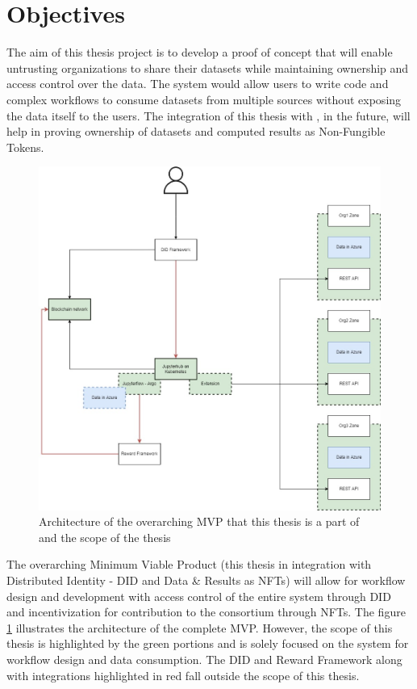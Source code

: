 \section{Objectives}
The aim of this thesis project is to develop a proof of concept that will enable untrusting organizations to share their datasets while maintaining ownership and access control over the data. The system would allow users to write code and complex workflows to consume datasets from multiple sources without exposing the data itself to the users. The integration of this thesis with \cite{nft-thesis}, in the future, will help in proving ownership of datasets and computed results as Non-Fungible Tokens.

\begin{figure}
    \centering
    \includegraphics[width=14cm,keepaspectratio]{photos/Overview.jpg}
    \caption{Architecture of the overarching MVP that this thesis is a part of and the scope of the thesis}
    \label{fig:overview}
\end{figure}

\bigskip
The overarching Minimum Viable Product (this thesis in integration with Distributed Identity - DID and Data \& Results as NFTs) will allow for workflow design and development with access control of the entire system through DID and incentivization for contribution to the consortium through NFTs. The figure \ref{fig:overview} illustrates the architecture of the complete MVP. However, the scope of this thesis is highlighted by the green portions and is solely focused on the system for workflow design and data consumption. The DID and Reward Framework along with integrations highlighted in red fall outside the scope of this thesis.

